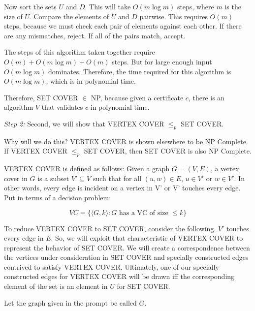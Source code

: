 \documentclass[11pt]{article}
\begin{document}
Now sort the sets $U$ and $D$. This will take $O(m \log m)$ steps, where $m$ is the size of $U$. Compare the elements of $U$ and $D$ pairwise. This requires $O(m)$ steps, because we must check each pair of elements against each other. If there are any mismatches, reject. If all of the pairs match, accept.

The steps of this algorithm taken together require $O(m) + O(m \log m) + O(m)$ steps. But for large enough input $O(m \log m)$ dominates. Therefore, the time required for this algorithm is $O(m \log m)$, which is in polynomial time.

Therefore, SET COVER $\in$ NP, because given a certificate $c$, there is an algorithm $V$ that validates $c$ in polynomial time.

\medskip

\emph{Step 2:} Second, we will show that VERTEX COVER $\le_p$ SET COVER.

Why will we do this? VERTEX COVER is shown elsewhere to be NP Complete. If VERTEX COVER $\le_p$ SET COVER, then SET COVER is also NP Complete.

VERTEX COVER is defined as follows:
Given a graph $G = (V, E)$, a vertex cover in $G$ is a subset $V' \subseteq V$ such that for all $(u,w) \in E$, $u \in V'$ or $w \in V'$. In other words, every edge is incident on a vertex in V' or V' touches every edge. Put in terms of a decision problem:

\[
VC = \{\langle G, k\rangle : G \text{ has a VC of size } \le k \} 
\]

To reduce VERTEX COVER to SET COVER, consider the following. $V'$ touches every edge in $E$. So, we will exploit that characteristic of VERTEX COVER to represent the behavior of SET COVER. We will create a correspondence between the vertices under consideration in SET COVER and specially constructed edges contrived to satisfy VERTEX COVER. Ultimately, one of our specially constructed edges for VERTEX COVER will be drawn iff the corresponding element of the set is an element in $U$ for SET COVER.

Let the graph given in the prompt be called $G$.

\medskip
\end{document}

